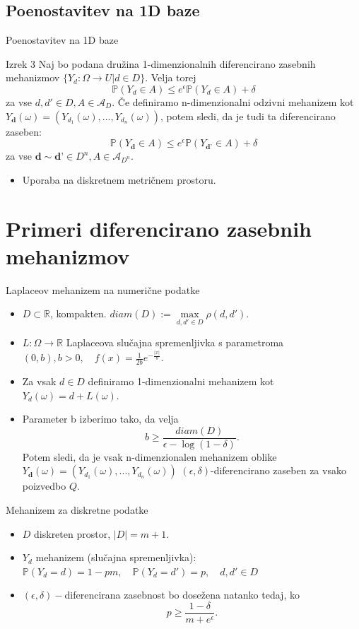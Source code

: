 \documentclass{beamer}
\begin{document}
\subsection{Poenostavitev na 1D baze}
\begin{frame}{Poenostavitev na 1D baze}
\begin{block}{Izrek 3}
Naj bo podana družina 1-dimenzionalnih diferencirano zasebnih mehanizmov $\{ Y_d: \Omega \rightarrow U | d \in D\}$. Velja torej
$$\mathbb{P}(Y_d \in A) \leq e^\epsilon \mathbb{P}(Y_d \in A) + \delta$$ 
za vse $d,d' \in D, A \in \mathcal{A}_D$. Če definiramo n-dimenzionalni odzivni mehanizem kot $Y_{\textbf{d}} (\omega) = (Y_{d_1} (\omega) , ... , Y_{d_n} (\omega))$, potem sledi, da je tudi ta diferencirano zaseben:
$$\mathbb{P}(Y_{\textbf{d}} \in A) \leq e^\epsilon \mathbb{P}(Y_{\textbf{d'}} \in A) + \delta$$
za vse $\textbf{d} \sim \textbf{d'} \in D^n, A \in \mathcal{A}_{D^n}$.
\end{block}
\begin{itemize}
\item Uporaba na diskretnem metričnem prostoru.
\end{itemize}
\end{frame}

\section{Primeri diferencirano zasebnih mehanizmov}
\begin{frame}{Laplaceov mehanizem na numerične podatke}
\begin{itemize}
\item  $D \subset \mathbb{R}$, kompakten. $diam(D) := \max\limits_{d,d' \in D}\rho(d,d')$. 
\item $L: \Omega \rightarrow \mathbb{R}$ Laplaceova slučajna spremenljivka s parametroma $(0,b), b > 0, \quad f(x)=\frac{1}{2b}e^{-\frac{|x|}{b}}$.  
\item Za vsak $d \in D$ definiramo 1-dimenzionalni mehanizem kot  $Y_{d}(\omega) = d + L(\omega)$. 
\item Parameter b izberimo tako, da velja
$$b\geq \frac{diam(D)}{\epsilon - \log(1-\delta)}.$$
Potem sledi, da je vsak n-dimenzionalen mehanizem oblike $Y_{\textbf{d}} (\omega) = (Y_{d_1} (\omega) , ... , Y_{d_n} (\omega))$ $(\epsilon, \delta)$-diferencirano zaseben za vsako poizvedbo $Q$. 
\end{itemize}
\end{frame}

\begin{frame}{Mehanizem za diskretne podatke}
\begin{itemize}
\item $D$ diskreten prostor, $|D| = m + 1$.
\item $Y_d$ mehanizem (slučajna spremenljivka): $\mathbb{P} (Y_d = d) = 1 - pm, \quad \mathbb{P}(Y_d = d') = p, \quad d, d' \in D$
\item $(\epsilon, \delta)-$diferencirana zasebnost bo dosežena natanko tedaj, ko $$p \geq \frac{1 - \delta}{m + e^{\epsilon}}.$$
\end{itemize}
\end{frame}
\end{document}

